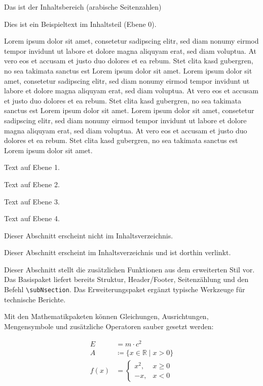\documentclass[12pt,a4paper]{article}
\begin{document}
\begin{Content}
	Das ist der Inhaltsbereich (arabische Seitenzahlen)

	Dies ist ein Beispieltext im Inhaltsteil (Ebene 0).

	Lorem ipsum dolor sit amet, consetetur sadipscing elitr, sed diam nonumy eirmod tempor invidunt ut labore et dolore magna aliquyam erat, sed diam voluptua. At vero eos et accusam et justo duo dolores et ea rebum. Stet clita kasd gubergren, no sea takimata sanctus est Lorem ipsum dolor sit amet. Lorem ipsum dolor sit amet, consetetur sadipscing elitr, sed diam nonumy eirmod tempor invidunt ut labore et dolore magna aliquyam erat, sed diam voluptua. At vero eos et accusam et justo duo dolores et ea rebum. Stet clita kasd gubergren, no sea takimata sanctus est Lorem ipsum dolor sit amet. Lorem ipsum dolor sit amet, consetetur sadipscing elitr, sed diam nonumy eirmod tempor invidunt ut labore et dolore magna aliquyam erat, sed diam voluptua. At vero eos et accusam et justo duo dolores et ea rebum. Stet clita kasd gubergren, no sea takimata sanctus est Lorem ipsum dolor sit amet.

	Text auf Ebene 1.

	Text auf Ebene 2.

	Text auf Ebene 3.

	Text auf Ebene 4.

	Dieser Abschnitt erscheint nicht im Inhaltsverzeichnis.

	Dieser Abschnitt erscheint im Inhaltsverzeichnis und ist dorthin verlinkt.
	
	Dieser Abschnitt stellt die zusätzlichen Funktionen aus dem erweiterten Stil vor. Das Basispaket liefert bereits Struktur, Header/Footer, Seitenzählung und den Befehl \verb|\subNsection|. Das Erweiterungspaket ergänzt typische Werkzeuge für technische Berichte.

	Mit den Mathematikpaketen können Gleichungen, Ausrichtungen, Mengensymbole und zusätzliche Operatoren sauber gesetzt werden:

	\begin{align}
		E &= m \cdot c^2 \\
		A &\coloneqq \{x \in \mathbb{R} \mid x > 0\} \\
		f(x) &= \begin{cases}
			x^2, & x \geq 0 \\
			-x,  & x < 0
		\end{cases}
	\end{align}


\end{Content}
\end{document}
